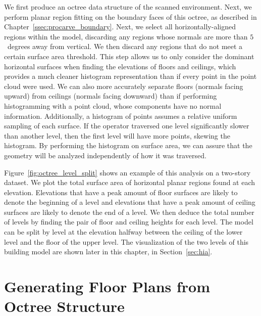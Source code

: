 \documentclass[12pt,onecolumn,oneside]{book}
\begin{document}
We first produce an octree data structure of the scanned environment.  Next, we perform planar region fitting on the boundary faces of this octree, as described in Chapter~\ref{ssec:procarve_boundary}.  Next, we select all horizontally-aligned regions within the model, discarding any regions whose normals are more than $5$~degrees away from vertical.  We then discard any regions that do not meet a certain surface area threshold.  This step allows us to only consider the dominant horizontal surfaces when finding the elevations of floors and ceilings, which provides a much cleaner histogram representation than if every point in the point cloud were used.  We can also more accurately separate floors (normals facing upward) from ceilings (normals facing downward) than if performing histogramming with a point cloud, whose components have no normal information.  Additionally, a histogram of points assumes a relative uniform sampling of each surface.  If the operator traversed one level significantly slower than another level, then the first level will have more points, skewing the histogram.  By performing the histogram on surface area, we can assure that the geometry will be analyzed independently of how it was traversed.

Figure~\ref{fig:octree_level_split} shows an example of this analysis on a two-story dataset.  We plot the total surface area of horizontal planar regions found at each elevation.  Elevations that have a peak amount of floor surfaces are likely to denote the beginning of a level and elevations that have a peak amount of ceiling surfaces are likely to denote the end of a level.  We then deduce the total number of levels by finding the pair of floor and ceiling heights for each level.  The model can be split by level at the elevation halfway between the ceiling of the lower level and the floor of the upper level.  The visualization of the two levels of this building model are shown later in this chapter, in Section~\ref{sec:hia}.

\section{Generating Floor Plans from Octree Structure}
\label{sec:oct2fp}
\end{document}
